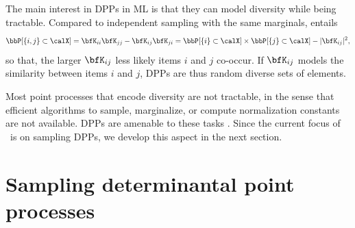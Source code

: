 \documentclass[twoside,11pt]{article}
\begin{document}
        The main interest in DPPs in ML is that they can model diversity while being tractable.
        Compared to independent sampling with the same marginals,  entails
        \begin{equation*}
        \label{eq:2point_correlation_function_inclusion_proba_finite_case}
          \Proba{\{i,j\} \subset \calX}
            = {\bfK}_{ii}{\bfK}_{jj}-{\bfK}_{ij}{\bfK}_{ji}
            = \Proba{\{i\} \subset \calX}
              \times \Proba{\{j\} \subset \calX}
                - |{\bfK}_{ij}|^2,
        \end{equation*}
        so that, the larger $\bfK_{ij}$ less likely items $i$ and $j$ co-occur.
        If $\bfK_{ij}$ models the similarity between items $i$ and $j$, DPPs are thus random diverse sets of elements.

        Most point processes that encode diversity are not tractable, in the sense that efficient algorithms to sample, marginalize, or compute normalization constants are not available.
        DPPs are amenable to these tasks \citep{KuTa12,Gil14}.
        Since the current focus of \DPPy\ is on sampling DPPs, we develop this aspect in the next section.


    \section{Sampling determinantal point processes} %
    \label{sec:sampling}
\end{document}
